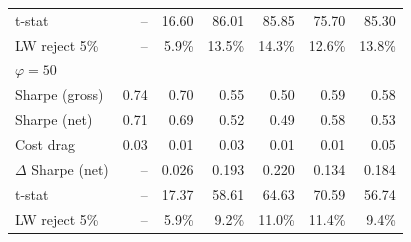 \begin{tabular*}{\textwidth}{l@{\extracolsep{\fill}}rrrrrr}
t-stat & --\phantom{$^{***}$} & 16.60\phantom{$^{***}$} & 86.01\phantom{$^{***}$} & 85.85\phantom{$^{***}$} & 75.70\phantom{$^{***}$} & 85.30\phantom{$^{***}$} \\
LW reject 5\% & --\phantom{$^{***}$} & 5.9\%\phantom{$^{***}$} & 13.5\%\phantom{$^{***}$} & 14.3\%\phantom{$^{***}$} & 12.6\%\phantom{$^{***}$} & 13.8\%\phantom{$^{***}$} \\
\midrule
\multicolumn{7}{l}{\textit{$\varphi = 50$}} \\
\midrule
Sharpe (gross) & 0.74\phantom{$^{***}$} & 0.70\phantom{$^{***}$} & 0.55\phantom{$^{***}$} & 0.50\phantom{$^{***}$} & 0.59\phantom{$^{***}$} & 0.58\phantom{$^{***}$} \\
Sharpe (net) & 0.71\phantom{$^{***}$} & 0.69\phantom{$^{***}$} & 0.52\phantom{$^{***}$} & 0.49\phantom{$^{***}$} & 0.58\phantom{$^{***}$} & 0.53\phantom{$^{***}$} \\
Cost drag & 0.03\phantom{$^{***}$} & 0.01\phantom{$^{***}$} & 0.03\phantom{$^{***}$} & 0.01\phantom{$^{***}$} & 0.01\phantom{$^{***}$} & 0.05\phantom{$^{***}$} \\
$\Delta$ Sharpe (net) & --\phantom{$^{***}$} & 0.026\rlap{$^{***}$}\phantom{$^{***}$} & 0.193\rlap{$^{***}$}\phantom{$^{***}$} & 0.220\rlap{$^{***}$}\phantom{$^{***}$} & 0.134\rlap{$^{***}$}\phantom{$^{***}$} & 0.184\rlap{$^{***}$}\phantom{$^{***}$} \\
t-stat & --\phantom{$^{***}$} & 17.37\phantom{$^{***}$} & 58.61\phantom{$^{***}$} & 64.63\phantom{$^{***}$} & 70.59\phantom{$^{***}$} & 56.74\phantom{$^{***}$} \\
LW reject 5\% & --\phantom{$^{***}$} & 5.9\%\phantom{$^{***}$} & 9.2\%\phantom{$^{***}$} & 11.0\%\phantom{$^{***}$} & 11.4\%\phantom{$^{***}$} & 9.4\%\phantom{$^{***}$} \\
\bottomrule
\end{tabular*}

